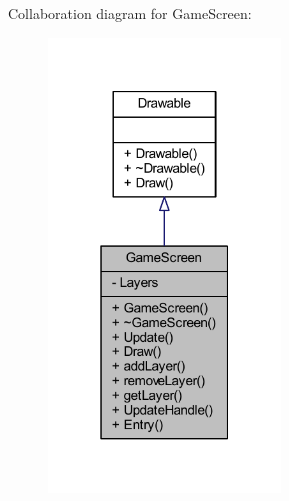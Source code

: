 Collaboration diagram for Game\-Screen\-:\nopagebreak
\begin{figure}[H]
\begin{center}
\leavevmode
\includegraphics[width=175pt]{class_game_screen__coll__graph}
\end{center}
\end{figure}
